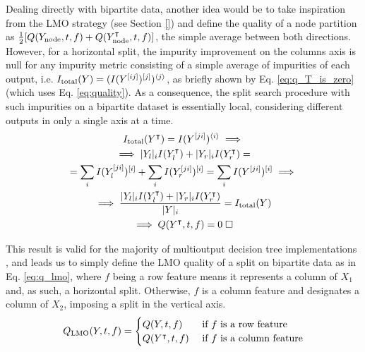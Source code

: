 Dealing directly with bipartite data, another idea would be to take inspiration from the LMO strategy (see Section \ref{}) and define the quality of a node partition as $\frac{1}{2}[Q(Y_\text{node}, t, f)+Q(Y^\intercal_\text{node}, t, f)]$, the simple average between both directions. However, for a horizontal split, the impurity improvement on the columns axis is null for any impurity metric consisting of a simple average of impurities of each output, i.e. $I_\text{total}(Y)=(I(Y^{[ij]})^{[j]})^{\langle j \rangle}$, as briefly shown by Eq. \ref{eq:q_T_is_zero} (which uses Eq. \ref{eq:quality}). As a consequence, the split search procedure with such impurities on a bipartite dataset is essentially local, considering different outputs in only a single axis at a time.
\begin{multline}
    I_\text{total}(Y\T) = I(Y\el{ji})\mel i\implies\\
    \implies |Y_l|_i I(Y_l\T) + |Y_r|_i I(Y_r\T)=\\
    = \sum_i I(Y_l\el{ji})\el i + \sum_i I(Y_r\el{ji})\el i %
    = \sum_i I(Y\el{ji})\el i\implies\\
    \implies \frac{|Y_l|_i I(Y_l\T) + |Y_r|_i I(Y_r\T)}{|Y|_i}=I_\text{total}(Y)\\
    \implies Q(Y\T, t, f) = 0 \;\square
    \label{eq:q_T_is_zero}
\end{multline}

This result is valid for the majority of multioutput decision tree implementations \cite{}, and leads us to simply define the LMO quality of a split on bipartite data as in Eq. \ref{eq:q_lmo}, where $f$ being a row feature means it represents a column of $X_1$ and, as such, a horizontal split. Otherwise, $f$ is a column feature and designates a column of $X_2$, imposing a split in the vertical axis.
\begin{equation}
    Q_\text{LMO}(Y, t, f) =
    \begin{cases}
        Q(Y, t, f)&\text{ if $f$ is a row feature}\\
        Q(Y^\intercal, t, f)&\text{ if $f$ is a column feature}
    \end{cases}
    \label{eq:q_lmo}
\end{equation}

